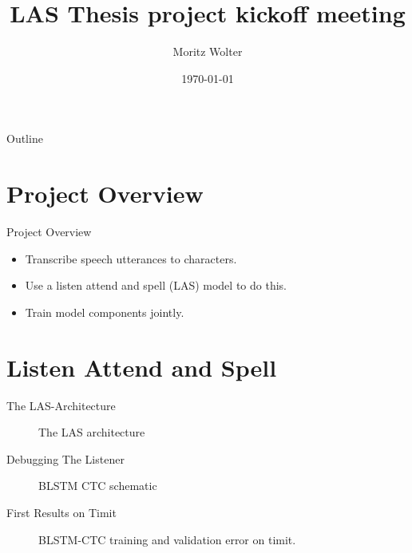 \documentclass{beamer}
\title{LAS Thesis project kickoff meeting}
\author{Moritz Wolter}
\date{\today}
\begin{document}
\begin{frame}
  \titlepage
\end{frame}


\begin{frame}{Outline}
  \tableofcontents
\end{frame}

\section{Project Overview}
\begin{frame}{Project Overview}
	\begin{itemize}
		\item Transcribe speech utterances to characters. 
		\item Use a listen attend and spell (LAS) model to do this.
		\item Train model components jointly.
	\end{itemize}
\end{frame}

\section{Listen Attend and Spell}

\begin{frame}{The LAS-Architecture}
	\begin{figure}
		\caption{The LAS architecture}
		\label{fig:las}
	\end{figure}
\end{frame}

\begin{frame}{Debugging The Listener}
	\begin{figure}
		
		\caption{BLSTM CTC schematic}
	\end{figure}
\end{frame}


\begin{frame}{First Results on Timit}
	\begin{figure}
		
		\caption{BLSTM-CTC training and validation error on timit.}
	\end{figure}
\end{frame}
\end{document}
